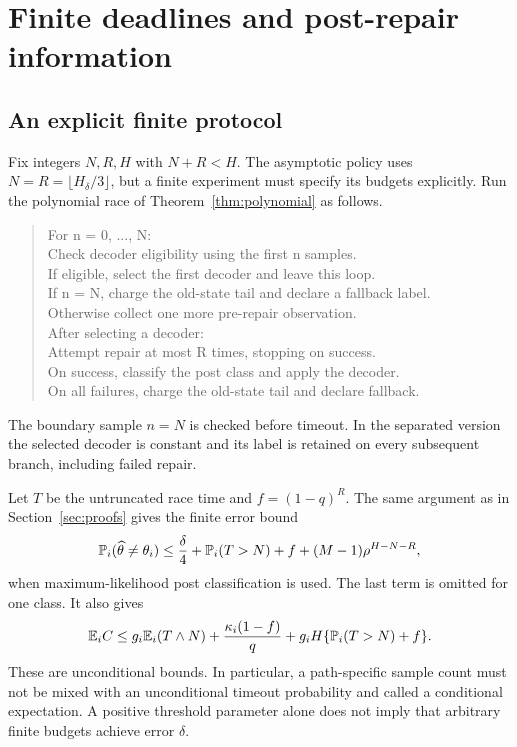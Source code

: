 \section{Finite deadlines and post-repair information}
\label{sec:finite-deadline}

\subsection{An explicit finite protocol}
Fix integers $N,R,H$ with $N+R<H$. The asymptotic policy uses
$N=R=\lfloor H_\delta/3\rfloor$, but a finite experiment must specify its
budgets explicitly. Run the polynomial race of
Theorem~\ref{thm:polynomial} as follows.
\begin{quote}\ttfamily\small
For n = 0, ..., N:\\
\hspace*{1em}Check decoder eligibility using the first n samples.\\
\hspace*{1em}If eligible, select the first decoder and leave this loop.\\
\hspace*{1em}If n = N, charge the old-state tail and declare a fallback label.\\
\hspace*{1em}Otherwise collect one more pre-repair observation.\\
After selecting a decoder:\\
\hspace*{1em}Attempt repair at most R times, stopping on success.\\
\hspace*{1em}On success, classify the post class and apply the decoder.\\
\hspace*{1em}On all failures, charge the old-state tail and declare fallback.
\end{quote}
The boundary sample $n=N$ is checked before timeout. In the separated
version the selected decoder is constant and its label is retained on every
subsequent branch, including failed repair.

Let $T$ be the untruncated race time and $f=(1-q)^R$. The same argument as
in Section~\ref{sec:proofs} gives the finite error bound
\begin{equation}
\mathbb P_i(\widehat\theta\ne\theta_i)
\le \frac{\delta}{4}+\mathbb P_i(T>N)+f+(M-1)\rho^{H-N-R},
\label{eq:finite-error-general}
\end{equation}
when maximum-likelihood post classification is used. The last term is
omitted for one class. It also gives
\begin{equation}
\mathbb E_iC\le
g_i\mathbb E_i(T\wedge N)+\frac{\kappa_i(1-f)}q
+g_iH\{\mathbb P_i(T>N)+f\}.
\label{eq:finite-cost-general}
\end{equation}
These are unconditional bounds. In particular, a path-specific sample count
must not be mixed with an unconditional timeout probability and called a
conditional expectation. A positive threshold parameter alone does not imply
that arbitrary finite budgets achieve error $\delta$.

